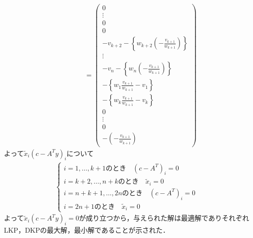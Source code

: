 \documentclass[a4j,uplatex]{jsarticle}
\theoremstyle{definition}
\begin{document}
\begin{align*}
    \phantom{c-A^Ty} & = \begin{pmatrix}
                             0                                                         \\
                             \vdots                                                    \\
                             0                                                         \\
                             0                                                         \\
                             -v_{k+2}-\left\{w_{k+2}(-\frac{v_{k+1}}{w_{k+1}})\right\} \\
                             \vdots                                                    \\
                             -v_n-\left\{w_n(-\frac{v_{k+1}}{w_{k+1}})\right\}         \\
                             -\left\{w_1\frac{v_{k+1}}{w_{k+1}}-v_1\right\}            \\
                             -\left\{w_k\frac{v_{k+1}}{w_{k+1}}-v_k\right\}            \\
                             0                                                         \\
                             \vdots                                                    \\
                             0                                                         \\
                             -\left(-\frac{v_{k+1}}{w_{k+1}}\right)
                         \end{pmatrix}
\end{align*}
よって$\tilde{x}_i\left(c-A^Ty\right)_i$について
\begin{align*}
    \begin{cases}
        i=1,\dots,k+1\text{のとき}\quad \left(c-A^T\right)_i=0    \\
        i=k+2,\dots,n+k\text{のとき}\quad \tilde{x}_i=0           \\
        i=n+k+1,\dots,2n\text{のとき}\quad \left(c-A^T\right)_i=0 \\
        i=2n+1\text{のとき}\quad \tilde{x}_i=0
    \end{cases}
\end{align*}
よって$\tilde{x}_i\left(c-A^Ty\right)_i=0$が成り立つから，与えられた解は最適解でありそれぞれLKP，DKPの最大解，最小解であることが示された．
\end{document}
